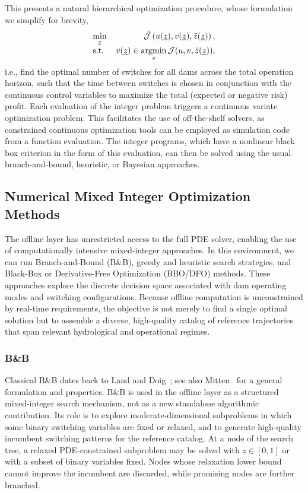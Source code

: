 \documentclass{article}
\newcommand{\1}{\mathds{1}}          %
\def\fct#1{\mathop{\rm #1}}
\def\Argmin {\fct{argmin}}
\theoremstyle{definition}
\begin{document}
\begin{sloppypar}
This presents a natural hierarchical optimization procedure, whose formulation we simplify for brevity,
\begin{equation}\label{eq:offtwolayer}
\begin{array}{lr}
\min\limits_{\underline{z}} & \hat{\mathcal{J}}\left(u(\underline{z}),v(\underline{z}),\bar{z}(\underline{z})\right),\\
\text{s.t. } & v(\underline{z})\in\Argmin\limits_{v}\mathcal{J}(u,v,\bar{z}(\underline{z})),
\end{array}
\end{equation}
i.e., find the optimal number of switches for all dams across the total operation horizon, such that the time between switches is chosen in conjunction with the continuous control variables to maximize the total (expected or negative risk) profit. Each evaluation of the integer problem triggers a continuous variate optimization problem. This facilitates the use of off-the-shelf solvers, as constrained continuous optimization tools can be employed as simulation code from a function evaluation. The integer programs, which have a nonlinear black box criterion in the form of this evaluation, can then be solved using the usual branch-and-bound, heuristic, or Bayesian approaches.



\subsection{Numerical Mixed Integer Optimization Methods}

The offline layer has unrestricted access to the full PDE solver, enabling the use of computationally intensive mixed-integer approaches. In this environment, we can run Branch-and-Bound (B\&B), greedy and heuristic search strategies, and Black-Box or Derivative-Free Optimization (BBO/DFO) methods. These approaches explore the discrete decision space associated with dam operating modes and switching configurations. Because offline computation is unconstrained by real-time requirements, the objective is
not merely to find a single optimal solution but to assemble a diverse, high-quality catalog of reference trajectories that span relevant hydrological and operational regimes.

\subsubsection{B\&B}

Classical B\&B dates back to Land and Doig~\cite{Land1960};
see also Mitten~\cite{mitten1970branch} for a general formulation and properties.
B\&B is used in the offline layer as a structured mixed-integer search mechanism,
not as a new standalone algorithmic contribution. Its role is to explore moderate-dimensional
subproblems in which some binary switching variables are fixed or relaxed, and to generate
high-quality incumbent switching patterns for the reference catalog. At a node of the search
tree, a relaxed PDE-constrained subproblem may be solved with $z\in[0,1]$ or with a subset
of binary variables fixed. Nodes whose relaxation lower bound cannot improve the incumbent
are discarded, while promising nodes are further branched.


\end{sloppypar}
\end{document}
